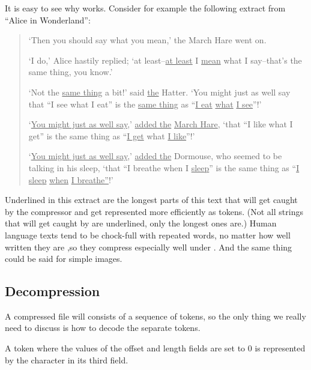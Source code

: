 It is easy to see why \lzone works. Consider for example the following
extract from ``Alice in Wonderland'':

\begin{quote}
  `Then you should say what you mean,' the March Hare went on.

  `I do,' Alice hastily replied; `at least--\underline{at least} I
  \underline{mean} what I say--that's the same thing, you know.'

  `Not the \underline{same thing} a bit!' said \underline{the} Hatter.
  `You might just as well say that ``I see what I eat'' is the
  \underline{same thing} as ``\underline{I eat} \underline{what}
  \underline{I see}''!'

  `\underline{You might just as well say},' \underline{added the}
  \underline{March Hare}, `that ``I like what I get'' is the same
  thing as ``\underline{I get} what \underline{I like}''!'

  `\underline{You might just as well say},' \underline{added the}
  Dormouse, who seemed to be talking in his sleep, `that ``I breathe
  when I \underline{sleep}'' is the same thing as ``\underline{I
    sleep} \underline{when} \underline{I breathe''}!'

\end{quote}

Underlined in this extract are the longest parts of this text that
will get caught by the \lzone compressor and get represented more
efficiently as tokens. (Not all strings that will get caught by \lzone
are underlined, only the longest ones are.) Human language texts tend
to be chock-full with repeated words, no matter how well written they
are ,so they compress especially well under \lzone. And the same thing
could be said for simple images.

\subsection{Decompression}

A \lzone compressed file will consists of a sequence of \lzone tokens, so
the only thing we really need to discuss is how to decode the separate
tokens.

A token where the values of the offset and length fields are set to
$0$ is represented by the character in its third field.

